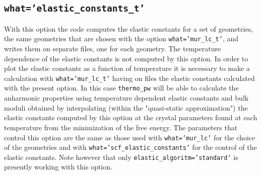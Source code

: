 \documentclass[12pt,a4paper]{article}
\begin{document}
\subsection{\color{web-blue}\texttt{what='elastic\_constants\_t'}}

With this option the code computes the elastic constants for a set of
geometries, the same geometries that are chosen with the option 
\texttt{what='mur\_lc\_t'}, and writes them on separate files, one for
each geometry. The temperature dependence of the elastic constants is
not computed by this option. In order to plot the elastic constants
as a function of temperature it is necessary to make a calculation
with \texttt{what='mur\_lc\_t'} having on files the elastic constants
calculated with the present option. In this case \texttt{thermo\_pw}
will be able to calculate the anharmonic properties using temperature
dependent elastic constants and bulk moduli obtained by interpolating 
(within the "quasi-static approximation") the elastic constants computed 
by this option at the crystal parameters 
found at each temperature from the minimization of the free energy. 
The parameters that control this option are the same as those used with  
\texttt{what='mur\_lc'} for the choice of the geometries and with
\texttt{what='scf\_elastic\_constants'} for the control of the elastic
constants. Note however that only \texttt{elastic\_algoritm='standard'}
is presently working with this option.

%
%
\end{document}
